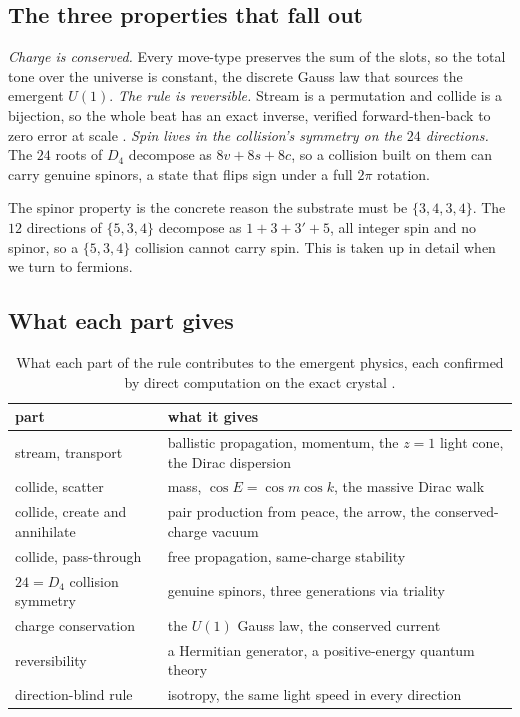 \subsection{The three properties that fall out}

\begin{result}
\emph{Charge is conserved.} Every move-type preserves the sum of the slots, so the total tone over the universe is
constant, the discrete Gauss law that sources the emergent $U(1)$. \emph{The rule is reversible.} Stream is a
permutation and collide is a bijection, so the whole beat has an exact inverse, verified forward-then-back to zero
error at scale \cite{pollard2026vibetest}. \emph{Spin lives in the collision's symmetry on the $24$ directions.}
The $24$ roots of $D_4$ decompose as $8v + 8s + 8c$, so a collision built on them can carry genuine spinors, a
state that flips sign under a full $2\pi$ rotation.
\end{result}

The spinor property is the concrete reason the substrate must be $\{3,4,3,4\}$. The $12$ directions of
$\{5,3,4\}$ decompose as $1 + 3 + 3' + 5$, all integer spin and no spinor, so a $\{5,3,4\}$ collision cannot
carry spin. This is taken up in detail when we turn to fermions.

\subsection{What each part gives}

\begin{table}[h]
\centering
\begin{tabular}{ll}
\toprule
part & what it gives \\
\midrule
stream, transport & ballistic propagation, momentum, the $z=1$ light cone, the Dirac dispersion \\
collide, scatter & mass, $\cos E = \cos m \cos k$, the massive Dirac walk \\
collide, create and annihilate & pair production from peace, the arrow, the conserved-charge vacuum \\
collide, pass-through & free propagation, same-charge stability \\
$24 = D_4$ collision symmetry & genuine spinors, three generations via triality \\
charge conservation & the $U(1)$ Gauss law, the conserved current \\
reversibility & a Hermitian generator, a positive-energy quantum theory \\
direction-blind rule & isotropy, the same light speed in every direction \\
\bottomrule
\end{tabular}
\caption{What each part of the rule contributes to the emergent physics, each confirmed by direct computation on
the exact crystal \cite{pollard2026vibetest}.}
\end{table}

